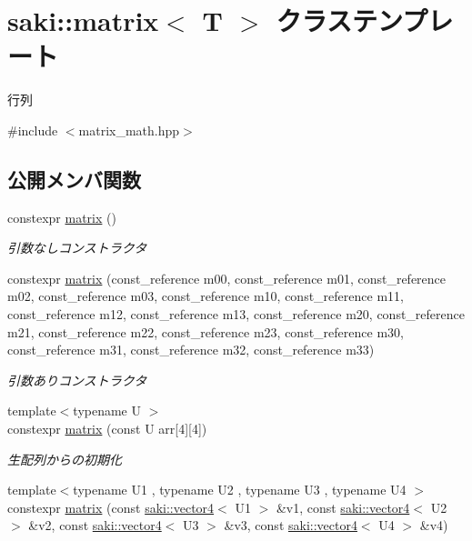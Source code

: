 \hypertarget{classsaki_1_1matrix}{}\section{saki\+:\+:matrix$<$ T $>$ クラステンプレート}
\label{classsaki_1_1matrix}


行列  




{\ttfamily \#include $<$matrix\+\_\+math.\+hpp$>$}

\subsection*{公開メンバ関数}
\begin{DoxyCompactItemize}
\item 
constexpr \mbox{\hyperlink{classsaki_1_1matrix_aca5102e0cdaedc779d668597d03baf10}{matrix}} ()
\begin{DoxyCompactList}\small\item\em 引数なしコンストラクタ \end{DoxyCompactList}\item 
constexpr \mbox{\hyperlink{classsaki_1_1matrix_a55edebaa14a4a0ea6b6f263ebe9950f4}{matrix}} (const\+\_\+reference m00, const\+\_\+reference m01, const\+\_\+reference m02, const\+\_\+reference m03, const\+\_\+reference m10, const\+\_\+reference m11, const\+\_\+reference m12, const\+\_\+reference m13, const\+\_\+reference m20, const\+\_\+reference m21, const\+\_\+reference m22, const\+\_\+reference m23, const\+\_\+reference m30, const\+\_\+reference m31, const\+\_\+reference m32, const\+\_\+reference m33)
\begin{DoxyCompactList}\small\item\em 引数ありコンストラクタ \end{DoxyCompactList}\item 
{\footnotesize template$<$typename U $>$ }\\constexpr \mbox{\hyperlink{classsaki_1_1matrix_aadbe6027fea1fecafc641cd553855408}{matrix}} (const U arr\mbox{[}4\mbox{]}\mbox{[}4\mbox{]})
\begin{DoxyCompactList}\small\item\em 生配列からの初期化 \end{DoxyCompactList}\item 
{\footnotesize template$<$typename U1 , typename U2 , typename U3 , typename U4 $>$ }\\constexpr \mbox{\hyperlink{classsaki_1_1matrix_a05256e26b2d44fe97a157c5bb510cdaf}{matrix}} (const \mbox{\hyperlink{classsaki_1_1vector4}{saki\+::vector4}}$<$ U1 $>$ \&v1, const \mbox{\hyperlink{classsaki_1_1vector4}{saki\+::vector4}}$<$ U2 $>$ \&v2, const \mbox{\hyperlink{classsaki_1_1vector4}{saki\+::vector4}}$<$ U3 $>$ \&v3, const \mbox{\hyperlink{classsaki_1_1vector4}{saki\+::vector4}}$<$ U4 $>$ \&v4)

\end{DoxyCompactItemize}
